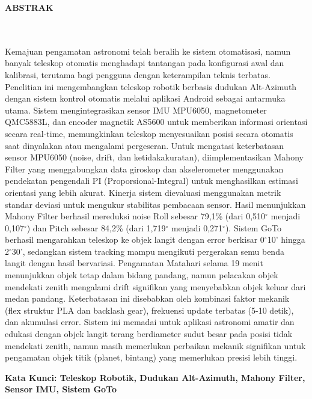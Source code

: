 \clearpage
{}%
\thispagestyle{fancy}

\begin{center}
	\large \bfseries \MakeUppercase{Abstrak}\\
	\normalsize \normalfont {\thetitle}\\
	\normalsize \normalfont {\theauthor}\\
	\bigskip
	
	\normalsize \normalfont \justifying \singlespacing
	Kemajuan pengamatan astronomi telah beralih ke sistem otomatisasi, namun banyak teleskop otomatis menghadapi tantangan pada konfigurasi awal dan kalibrasi, terutama bagi pengguna dengan keterampilan teknis terbatas. Penelitian ini mengembangkan teleskop robotik berbasis dudukan Alt-Azimuth dengan sistem kontrol otomatis melalui aplikasi Android sebagai antarmuka utama. Sistem mengintegrasikan sensor IMU MPU6050, magnetometer QMC5883L, dan encoder magnetik AS5600 untuk memberikan informasi orientasi secara real-time, memungkinkan teleskop menyesuaikan posisi secara otomatis saat dinyalakan atau mengalami pergeseran. Untuk mengatasi keterbatasan sensor MPU6050 (noise, drift, dan ketidakakuratan), diimplementasikan Mahony Filter yang menggabungkan data giroskop dan akselerometer menggunakan pendekatan pengendali PI (Proporsional-Integral) untuk menghasilkan estimasi orientasi yang lebih akurat. Kinerja sistem dievaluasi menggunakan metrik standar deviasi untuk mengukur stabilitas pembacaan sensor. Hasil menunjukkan Mahony Filter berhasil mereduksi noise Roll sebesar 79,1\% (dari 0,510$^{\circ}$ menjadi 0,107$^{\circ}$) dan Pitch sebesar 84,2\% (dari 1,719$^{\circ}$ menjadi 0,271$^{\circ}$). Sistem GoTo berhasil mengarahkan teleskop ke objek langit dengan error berkisar 0$^{\circ}$10' hingga 2$^{\circ}$30', sedangkan sistem tracking mampu mengikuti pergerakan semu benda langit dengan hasil bervariasi. Pengamatan Matahari selama 19 menit menunjukkan objek tetap dalam bidang pandang, namun pelacakan objek mendekati zenith mengalami drift signifikan yang menyebabkan objek keluar dari medan pandang. Keterbatasan ini disebabkan oleh kombinasi faktor mekanik (flex struktur PLA dan backlash gear), frekuensi update terbatas (5-10 detik), dan akumulasi error. Sistem ini memadai untuk aplikasi astronomi amatir dan edukasi dengan objek langit terang berdiameter sudut besar pada posisi tidak mendekati zenith, namun masih memerlukan perbaikan mekanik signifikan untuk pengamatan objek titik (planet, bintang) yang memerlukan presisi lebih tinggi.\par

    \vspace{20pt}
	\raggedright \textbf{Kata Kunci: Teleskop Robotik, Dudukan Alt-Azimuth, Mahony Filter, Sensor IMU, Sistem GoTo}
	
	\vfill
	
\end{center}
\clearpage